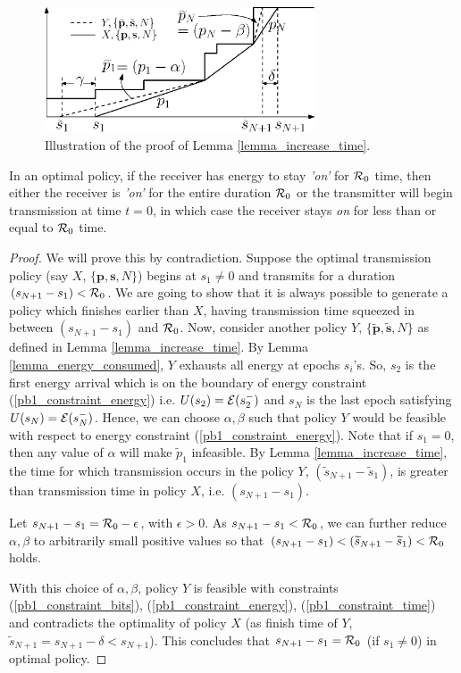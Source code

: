 \begin{figure}
\centering
  \centerline{\includegraphics[width=8cm]{Lemma4.eps}}
\caption{Illustration of the proof of Lemma \ref{lemma_increase_time}.}\label{lemma4}
\end{figure}

\begin{lemma}
In an optimal policy, if the receiver has energy to stay \textit{'on'} for $\mathcal{R}_0$ time, then either the receiver is \textit{'on'} for the entire duration $\mathcal{R}_0$ or the transmitter will begin transmission at time $t=0$, in which case the receiver stays \textit{on} for less than or equal to $\mathcal{R}_0$ time. 
\label{transmission_duration}
\end{lemma}
\begin{proof}
We will prove this by contradiction. Suppose the optimal transmission policy (say $X$, $\{\bm{p},\bm{s},N\}$) begins at $s_1\neq 0$ and transmits for a duration $(s_{N+1}-s_1)< \mathcal{R}_0$. We are going to show that it is always possible to generate a policy which finishes earlier than $X$, having transmission time squeezed in between $(s_{N+1}-s_1)$ and $\mathcal{R}_0$. Now, consider another policy $Y$, $\{\bm{\widetilde{p}},\bm{\widetilde{s}},N\}$ as defined in Lemma \ref{lemma_increase_time}. By Lemma \ref{lemma_energy_consumed}, $Y$ exhausts all energy at epochs $s_i$'s. So, $s_{2}$ is the first energy arrival which is on the boundary of energy constraint (\ref{pb1_constraint_energy}) i.e. $U(s_2)=\mathcal{E}(s_2^-)$ and $s_{N}$ is the last epoch satisfying $U(s_N)=\mathcal{E}(s_N^-)$. Hence, we can choose $\alpha ,\beta$ such that policy $Y$ would be feasible with respect to energy constraint (\ref{pb1_constraint_energy}). Note that if $s_1=0$, then any value of $\alpha$ will make $\widetilde{p}_1$ infeasible. By Lemma \ref{lemma_increase_time}, the time for which transmission occurs in the policy $Y$, $\left( \widetilde{s}_{N+1}-\widetilde{s}_1\right)$, is greater than transmission time in policy $X$, i.e. $(s_{N+1}-s_1)$.

Let $s_{N+1}-s_1=\mathcal{R}_0-\epsilon$, with $\epsilon >0$.
 As $s_{N+1}-s_1<\mathcal{R}_0$, we can further reduce $\alpha,\beta$ to arbitrarily small positive values so that $(s_{N+1}-s_1)<\left( \widetilde{s}_{N+1}-\widetilde{s}_1\right)<\mathcal{R}_0$ holds. 
 
 With this choice of $\alpha,\beta$, policy $Y$ is feasible with constraints  (\ref{pb1_constraint_bits}), (\ref{pb1_constraint_energy}), (\ref{pb1_constraint_time}) and contradicts the optimality of policy $X$ (as finish time of $Y$, $\widetilde{s}_{N+1}=s_{N+1}-\delta <s_{N+1}$). This concludes that $s_{N+1}-s_1=\mathcal{R}_0$ (if $s_1\neq 0$) in optimal policy.
\end{proof}
